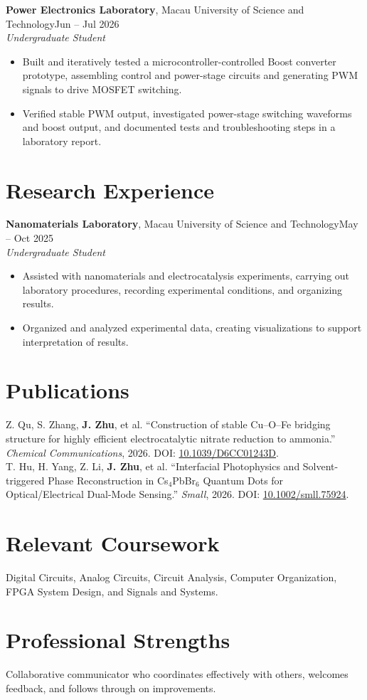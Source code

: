 \documentclass[10pt,a4paper]{article}
\begin{document}
\textbf{Power Electronics Laboratory}, Macau University of Science and Technology\hfill Jun -- Jul 2026\\
\textit{Undergraduate Student}
\begin{itemize}
  \item Built and iteratively tested a microcontroller-controlled Boost converter prototype, assembling control and power-stage circuits and generating PWM signals to drive MOSFET switching.
  \item Verified stable PWM output, investigated power-stage switching waveforms and boost output, and documented tests and troubleshooting steps in a laboratory report.
\end{itemize}

\section*{Research Experience}
\textbf{Nanomaterials Laboratory}, Macau University of Science and Technology\hfill May -- Oct 2025\\
\textit{Undergraduate Student}
\begin{itemize}
  \item Assisted with nanomaterials and electrocatalysis experiments, carrying out laboratory procedures, recording experimental conditions, and organizing results.
  \item Organized and analyzed experimental data, creating visualizations to support interpretation of results.
\end{itemize}

\section*{Publications}
Z. Qu, S. Zhang, \textbf{J. Zhu}, et al. ``Construction of stable Cu--O--Fe bridging structure for highly efficient electrocatalytic nitrate reduction to ammonia.'' \textit{Chemical Communications}, 2026. DOI: \href{https://doi.org/10.1039/D6CC01243D}{10.1039/D6CC01243D}.\\[3pt]
T. Hu, H. Yang, Z. Li, \textbf{J. Zhu}, et al. ``Interfacial Photophysics and Solvent-triggered Phase Reconstruction in Cs$_4$PbBr$_6$ Quantum Dots for Optical/Electrical Dual-Mode Sensing.'' \textit{Small}, 2026. DOI: \href{https://doi.org/10.1002/smll.75924}{10.1002/smll.75924}.

\section*{Relevant Coursework}
Digital Circuits, Analog Circuits, Circuit Analysis, Computer Organization, FPGA System Design, and Signals and Systems.

\section*{Professional Strengths}
Collaborative communicator who coordinates effectively with others, welcomes feedback, and follows through on improvements.
\end{document}
